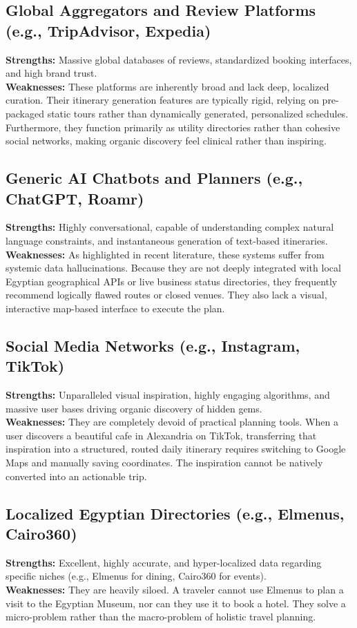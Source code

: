 \subsection{Global Aggregators and Review Platforms (e.g., TripAdvisor, Expedia)}
\textbf{Strengths:} Massive global databases of reviews, standardized booking interfaces, and high brand trust. \\
\textbf{Weaknesses:} These platforms are inherently broad and lack deep, localized curation. Their itinerary generation features are typically rigid, relying on pre-packaged static tours rather than dynamically generated, personalized schedules. Furthermore, they function primarily as utility directories rather than cohesive social networks, making organic discovery feel clinical rather than inspiring.

\subsection{Generic AI Chatbots and Planners (e.g., ChatGPT, Roamr)}
\textbf{Strengths:} Highly conversational, capable of understanding complex natural language constraints, and instantaneous generation of text-based itineraries. \\
\textbf{Weaknesses:} As highlighted in recent literature, these systems suffer from systemic data hallucinations. Because they are not deeply integrated with local Egyptian geographical APIs or live business status directories, they frequently recommend logically flawed routes or closed venues. They also lack a visual, interactive map-based interface to execute the plan.

\subsection{Social Media Networks (e.g., Instagram, TikTok)}
\textbf{Strengths:} Unparalleled visual inspiration, highly engaging algorithms, and massive user bases driving organic discovery of hidden gems. \\
\textbf{Weaknesses:} They are completely devoid of practical planning tools. When a user discovers a beautiful cafe in Alexandria on TikTok, transferring that inspiration into a structured, routed daily itinerary requires switching to Google Maps and manually saving coordinates. The inspiration cannot be natively converted into an actionable trip.

\subsection{Localized Egyptian Directories (e.g., Elmenus, Cairo360)}
\textbf{Strengths:} Excellent, highly accurate, and hyper-localized data regarding specific niches (e.g., Elmenus for dining, Cairo360 for events). \\
\textbf{Weaknesses:} They are heavily siloed. A traveler cannot use Elmenus to plan a visit to the Egyptian Museum, nor can they use it to book a hotel. They solve a micro-problem rather than the macro-problem of holistic travel planning.

